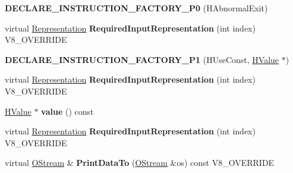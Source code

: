 \begin{DoxyCompactItemize}
\item 
\hypertarget{classv8_1_1internal_1_1_v8___f_i_n_a_l_a8ffd340bc734933601546c6b38034594}{}{\bfseries D\+E\+C\+L\+A\+R\+E\+\_\+\+I\+N\+S\+T\+R\+U\+C\+T\+I\+O\+N\+\_\+\+F\+A\+C\+T\+O\+R\+Y\+\_\+\+P0} (H\+Abnormal\+Exit)\label{classv8_1_1internal_1_1_v8___f_i_n_a_l_a8ffd340bc734933601546c6b38034594}

\item 
\hypertarget{classv8_1_1internal_1_1_v8___f_i_n_a_l_a6c6d1f37f40b113d8f4062f1ffff7215}{}virtual \hyperlink{classv8_1_1internal_1_1_representation}{Representation} {\bfseries Required\+Input\+Representation} (int index) V8\+\_\+\+O\+V\+E\+R\+R\+I\+D\+E\label{classv8_1_1internal_1_1_v8___f_i_n_a_l_a6c6d1f37f40b113d8f4062f1ffff7215}

\item 
\hypertarget{classv8_1_1internal_1_1_v8___f_i_n_a_l_a8789913410548dbf8b5f61d657d16ae8}{}{\bfseries D\+E\+C\+L\+A\+R\+E\+\_\+\+I\+N\+S\+T\+R\+U\+C\+T\+I\+O\+N\+\_\+\+F\+A\+C\+T\+O\+R\+Y\+\_\+\+P1} (H\+Use\+Const, \hyperlink{classv8_1_1internal_1_1_h_value}{H\+Value} $\ast$)\label{classv8_1_1internal_1_1_v8___f_i_n_a_l_a8789913410548dbf8b5f61d657d16ae8}

\item 
\hypertarget{classv8_1_1internal_1_1_v8___f_i_n_a_l_a6c6d1f37f40b113d8f4062f1ffff7215}{}virtual \hyperlink{classv8_1_1internal_1_1_representation}{Representation} {\bfseries Required\+Input\+Representation} (int index) V8\+\_\+\+O\+V\+E\+R\+R\+I\+D\+E\label{classv8_1_1internal_1_1_v8___f_i_n_a_l_a6c6d1f37f40b113d8f4062f1ffff7215}

\item 
\hypertarget{classv8_1_1internal_1_1_v8___f_i_n_a_l_a998b3feae0e84bbe080297551603911f}{}\hyperlink{classv8_1_1internal_1_1_h_value}{H\+Value} $\ast$ {\bfseries value} () const \label{classv8_1_1internal_1_1_v8___f_i_n_a_l_a998b3feae0e84bbe080297551603911f}

\item 
\hypertarget{classv8_1_1internal_1_1_v8___f_i_n_a_l_a6c6d1f37f40b113d8f4062f1ffff7215}{}virtual \hyperlink{classv8_1_1internal_1_1_representation}{Representation} {\bfseries Required\+Input\+Representation} (int index) V8\+\_\+\+O\+V\+E\+R\+R\+I\+D\+E\label{classv8_1_1internal_1_1_v8___f_i_n_a_l_a6c6d1f37f40b113d8f4062f1ffff7215}

\item 
\hypertarget{classv8_1_1internal_1_1_v8___f_i_n_a_l_ac450dad970b14246be761ccf5004924b}{}virtual \hyperlink{classv8_1_1internal_1_1_o_stream}{O\+Stream} \& {\bfseries Print\+Data\+To} (\hyperlink{classv8_1_1internal_1_1_o_stream}{O\+Stream} \&os) const V8\+\_\+\+O\+V\+E\+R\+R\+I\+D\+E\label{classv8_1_1internal_1_1_v8___f_i_n_a_l_ac450dad970b14246be761ccf5004924b}


\end{DoxyCompactItemize}
